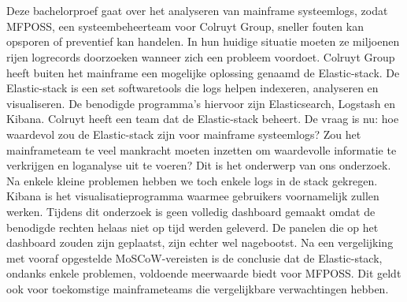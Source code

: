 
%
%
%
%
%


\chapter*{}

Deze bachelorproef gaat over het analyseren van mainframe systeemlogs, zodat MFPOSS, een systeembeheerteam voor Colruyt Group, sneller fouten kan opsporen of preventief kan handelen. In hun huidige situatie moeten ze miljoenen rijen logrecords doorzoeken wanneer zich een probleem voordoet. Colruyt Group heeft buiten het mainframe een mogelijke oplossing genaamd de Elastic-stack. De Elastic-stack is een set softwaretools die logs helpen indexeren, analyseren en visualiseren. De benodigde programma's hiervoor zijn Elasticsearch, Logstash en Kibana. Colruyt heeft een team dat de Elastic-stack beheert. De vraag is nu: hoe waardevol zou de Elastic-stack zijn voor mainframe systeemlogs? Zou het mainframeteam te veel mankracht moeten inzetten om waardevolle informatie te verkrijgen en loganalyse uit te voeren? Dit is het onderwerp van ons onderzoek. Na enkele kleine problemen hebben we toch enkele logs in de stack gekregen. Kibana is het visualisatieprogramma waarmee gebruikers voornamelijk zullen werken. Tijdens dit onderzoek is geen volledig dashboard gemaakt omdat de benodigde rechten helaas niet op tijd werden geleverd. De panelen die op het dashboard zouden zijn geplaatst, zijn echter wel nagebootst. Na een vergelijking met vooraf opgestelde MoSCoW-vereisten is de conclusie dat de Elastic-stack, ondanks enkele problemen, voldoende meerwaarde biedt voor MFPOSS. Dit geldt ook voor toekomstige mainframeteams die vergelijkbare verwachtingen hebben.

